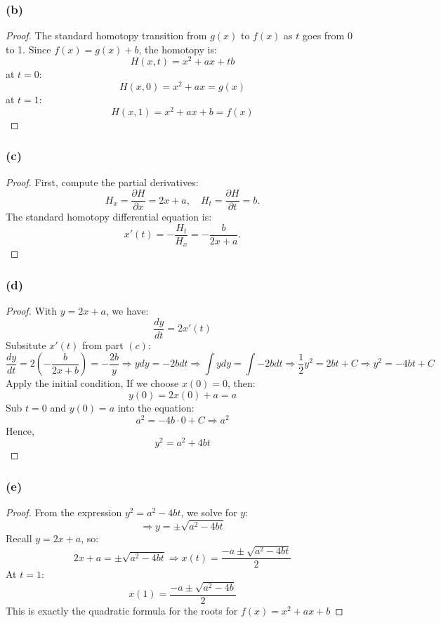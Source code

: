 \documentclass{article}
\begin{document}
\subsubsection*{(b)}
\begin{proof}
    The standard homotopy transition from $g(x)$ to $f(x)$ as $t$ goes from 0 to 1. Since $f(x) = g(x) + b$, the homotopy is:
    \[ H(x,t) = x^2 + ax + tb \]
    at $t = 0$:
    \[ H(x,0) = x^2 + ax = g(x) \] 
    at $t = 1$:
    \[ H(x,1) = x^2 + ax + b = f(x) \] 
\end{proof}

\subsubsection*{(c)}
\begin{proof}
    First, compute the partial derivatives:
    \[
        H_x = \frac{\partial H}{\partial x} = 2x + a, \quad H_t = \frac{\partial H}{\partial t} = b.
    \]
    The standard homotopy differential equation is:
    \[
        x'(t) = -\frac{H_t}{H_x} = -\frac{b}{2x + a}.
    \]
\end{proof}

\subsubsection*{(d)}
\begin{proof}
    With $y = 2x + a$, we have:
    \[
        \frac{dy}{dt} = 2x'(t)
    \]
    Subsitute $x'(t)$ from part $(c)$:
    \[ 
        \frac{dy}{dt} = 2\left( -\frac{b}{2x + b} \right) = -\frac{2b}{y} 
        \Rightarrow y dy = -2b dt 
        \Rightarrow \int y dy = \int -2b dt \Longrightarrow \frac{1}{2}y^2 = 2bt + C
        \Rightarrow y^2 = -4bt + C
    \]
    Apply the initial condition, If we choose $x(0) = 0$, then:
    \[ y(0) = 2x(0) + a = a \]
    Sub $t = 0$ and $y(0) = a$ into the equation:
    \[ a^2 = -4b \cdot 0 + C \Longrightarrow a^2 \]
    Hence, 
    \[ y^2 = a^2 + 4bt \]
\end{proof}

\subsubsection*{(e)}
\begin{proof}
    From the expression $y^2 = a^2 - 4bt$, we solve for $y$:
    \[ \Rightarrow y = \pm \sqrt{a^2 - 4bt} \]
    Recall $y = 2x + a$, so:
    \[ 2x + a = \pm \sqrt{a^2 - 4bt} \Rightarrow x(t) = \frac{-a \pm \sqrt{a^2 - 4bt}}{2} \]
    At $t = 1$:
    \[ x(1) = \frac{-a \pm \sqrt{a^2 - 4b}}{2} \]
    This is exactly the quadratic formula for the roots for $f(x) = x^2 + ax + b$
\end{proof}
\end{document}
